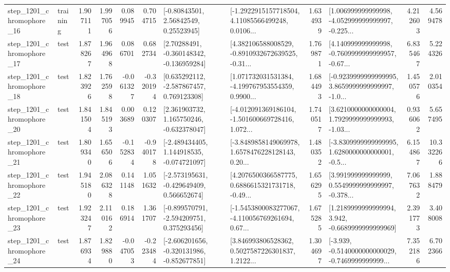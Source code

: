 \begin{tabular}{llrrrrllrlrr}
 step\_1201\_chromophore\_16 &  training &      1.907111 &    1.997056 &      0.089945 &  0.704715 &       [-0.80843501, 2.56842549, 0.25523945] &  [-1.2922915157718504, 4.11085566499248, 0.0106... &       1.634939 &  [1.006999999999998, -4.052999999999997, -0.225... &            4.212603 &          4.569478 \\
 step\_1201\_chromophore\_17 &      test &      1.878267 &    1.964968 &      0.086701 &  0.682734 &    [2.70288491, -0.360148342, -0.136959284] &  [4.382106588008529, -0.8910932672639525, -0.31... &       1.769871 &  [4.140999999999998, -0.7609999999999957, -0.67... &            6.835467 &          5.224326 \\
 step\_1201\_chromophore\_18 &      test &      1.823926 &    1.762598 &     -0.061327 & -0.320194 &    [0.635292112, -2.587867457, 0.769123308] &  [1.071732031531384, -4.199767953554359, 0.9900... &       1.684493 &  [-0.9239999999999995, 3.8659999999999997, -1.0... &            1.450576 &          2.010354 \\
 step\_1201\_chromophore\_20 &      test &      1.841504 &    1.845193 &      0.003689 &  0.120307 &    [2.361903732, 1.165750246, -0.632378047] &  [-4.012091369186104, -1.501600669728416, 1.072... &       1.740517 &  [3.6210000000000004, 1.7929999999999993, -1.03... &            0.936062 &          5.657495 \\
 step\_1201\_chromophore\_21 &      test &      1.809340 &    1.656506 &     -0.152834 & -0.940178 &   [-2.489434405, 1.144918535, -0.074721097] &  [-3.8489858149069978, 1.6578476228128143, 0.20... &       1.480352 &  [-3.8309999999999995, 1.6280000000000001, -0.5... &            6.154867 &         10.332266 \\
 step\_1201\_chromophore\_22 &      test &      1.945180 &    2.086328 &      0.141148 &  1.051632 &   [-2.573195631, -0.429649409, 0.566652674] &  [4.2076500366587775, 0.6886615321731718, -0.49... &       1.656295 &  [3.991999999999999, 0.5549999999999997, -0.378... &            7.067632 &          1.888479 \\
 step\_1201\_chromophore\_23 &      test &      1.923247 &    2.110162 &      0.186914 &  1.361707 &   [-0.899570791, -2.594209751, 0.375293456] &  [-1.5453800083277067, -4.110056769261694, 0.67... &       1.675285 &   [1.2189999999999994, 3.942, -0.6689999999999969] &            2.391773 &          3.408008 \\
 step\_1201\_chromophore\_24 &      test &      1.876934 &    1.829880 &     -0.047053 & -0.223484 &  [-2.606201656, -0.320131986, -0.852677851] &  [3.846993806528362, 0.5027587226301837, 1.2122... &       1.304697 &  [-3.939, -0.5140000000000029, -0.7469999999999... &            7.352186 &          6.702366 \\

\end{tabular}
